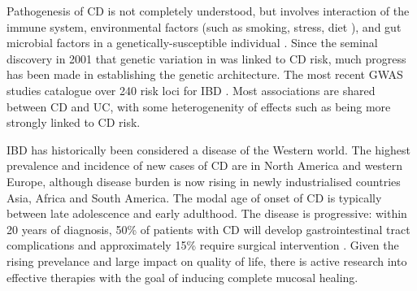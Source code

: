 \begin{outline}
Pathogenesis of \gls{CD} is not completely understood, but involves interaction of the immune system, environmental factors (such as smoking, stress, diet \autocite{ananthakrishnan2015EpidemiologyRiskFactors,roda2020CrohnDisease}), and gut microbial factors in a genetically-susceptible individual \autocite{desouza2016ImmunopathogenesisIBDCurrent}.
Since the seminal discovery in 2001 that genetic variation in  was linked to \gls{CD} risk\autocite{todd2001TacklingCommonDisease},
much progress has been made in establishing the genetic architecture.
The most recent \gls{GWAS} studies catalogue over 240 risk loci for \gls{IBD} \autocite{delange2017GenomewideAssociationStudy}.
Most associations are shared between \gls{CD} and \gls{UC}, with some heterogenenity of effects such as  being more strongly linked to \gls{CD} risk\autocite{jostins2012HostMicrobeInteractions,liu2015AssociationAnalysesIdentify}.

\gls{IBD} has historically been considered a disease of the Western world.
The highest prevalence and incidence of new cases of CD are in North America and western Europe\autocite{roda2020CrohnDisease},
although disease burden is now rising in newly industrialised countries Asia, Africa and South America\autocite{kaplan2015GlobalBurdenIBD,alatab2020GlobalRegionalNational}.
The modal age of onset of \gls{CD} is typically between late adolescence and early adulthood.
The disease is progressive: within 20 years of diagnosis, 50\% of patients with CD will develop gastrointestinal tract complications and approximately 15\% require surgical intervention \autocite{roda2020CrohnDisease}.
Given the rising prevelance and large impact on quality of life, there is active research into effective therapies with the goal of inducing complete mucosal healing\autocite{levin2016MechanismActionAntiTNF,roda2020CrohnDisease}.


\end{outline}
